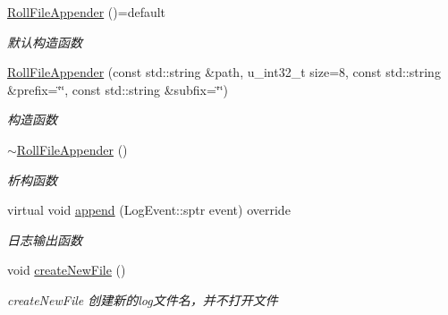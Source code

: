 \begin{DoxyCompactItemize}
\item 
\mbox{\label{classdaq_1_1RollFileAppender_a2bf4e22ee17d673a2541e2bd658cc260}} 
\hyperlink{classdaq_1_1RollFileAppender_a2bf4e22ee17d673a2541e2bd658cc260}{Roll\+File\+Appender} ()=default
\begin{DoxyCompactList}\small\item\em 默认构造函数 \end{DoxyCompactList}\item 
\hyperlink{classdaq_1_1RollFileAppender_aca76aebe714fc6c86e9392f3d9753306}{Roll\+File\+Appender} (const std\+::string \&path, u\+\_\+int32\+\_\+t size=8, const std\+::string \&prefix=\char`\"{}\char`\"{}, const std\+::string \&subfix=\char`\"{}\char`\"{})
\begin{DoxyCompactList}\small\item\em 构造函数 \end{DoxyCompactList}\item 
\mbox{\label{classdaq_1_1RollFileAppender_a2ff7f6635612b8ac3be2d4560bf16478}} 
\hyperlink{classdaq_1_1RollFileAppender_a2ff7f6635612b8ac3be2d4560bf16478}{$\sim$\+Roll\+File\+Appender} ()
\begin{DoxyCompactList}\small\item\em 析构函数 \end{DoxyCompactList}\item 
virtual void \hyperlink{classdaq_1_1RollFileAppender_a5042aa4b9e9c2043649eacdfa9f43f6c}{append} (Log\+Event\+::sptr event) override
\begin{DoxyCompactList}\small\item\em 日志输出函数 \end{DoxyCompactList}\item 
\mbox{\label{classdaq_1_1RollFileAppender_af2baed82dead83a8ff8f616d559d8da7}} 
void \hyperlink{classdaq_1_1RollFileAppender_af2baed82dead83a8ff8f616d559d8da7}{create\+New\+File} ()
\begin{DoxyCompactList}\small\item\em create\+New\+File 创建新的log文件名，并不打开文件 \end{DoxyCompactList}\item 
\mbox{\label{classdaq_1_1RollFileAppender_a8d5490176e68cc972c67e12a49a17da2}} 

\end{DoxyCompactItemize}
